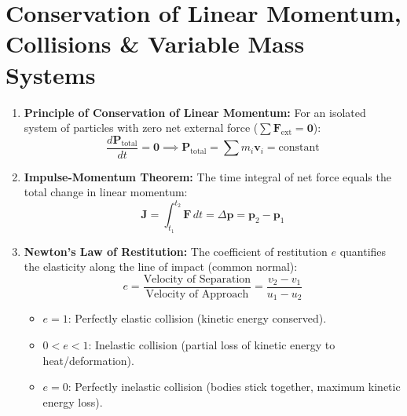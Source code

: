 \documentclass[10pt,a4paper]{article}
\begin{document}
\section{Conservation of Linear Momentum, Collisions \& Variable Mass Systems}

\begin{conceptbox}
\begin{enumerate}[leftmargin=*]
  \item \textbf{Principle of Conservation of Linear Momentum:} For an isolated system of particles with zero net external force ($\sum \mathbf{F}_{\text{ext}} = \mathbf{0}$):
  \begin{equation}
    \frac{d\mathbf{P}_{\text{total}}}{dt} = \mathbf{0} \implies \mathbf{P}_{\text{total}} = \sum m_i \mathbf{v}_i = \text{constant}
  \end{equation}
  \item \textbf{Impulse-Momentum Theorem:} The time integral of net force equals the total change in linear momentum:
  \begin{equation}
    \mathbf{J} = \int_{t_1}^{t_2} \mathbf{F}\,dt = \Delta\mathbf{p} = \mathbf{p}_2 - \mathbf{p}_1
  \end{equation}
  \item \textbf{Newton's Law of Restitution:} The coefficient of restitution $e$ quantifies the elasticity along the line of impact (common normal):
  \begin{equation}
    e = \frac{\text{Velocity of Separation}}{\text{Velocity of Approach}} = \frac{v_2 - v_1}{u_1 - u_2}
  \end{equation}
  \begin{itemize}
    \item $e = 1$: Perfectly elastic collision (kinetic energy conserved).
    \item $0 < e < 1$: Inelastic collision (partial loss of kinetic energy to heat/deformation).
    \item $e = 0$: Perfectly inelastic collision (bodies stick together, maximum kinetic energy loss).
  \end{itemize}
\end{enumerate}
\end{conceptbox}
\end{document}

